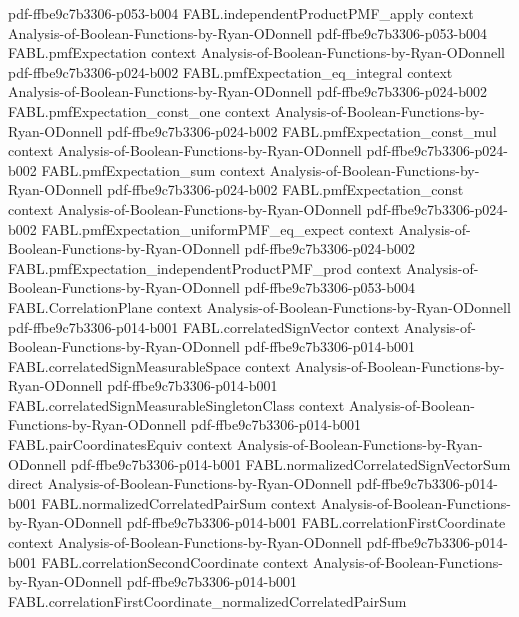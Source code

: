 \begin{theorem}
  {pdf-ffbe9c7b3306-p053-b004}
\proofstep
  {FABL.independentProductPMF_apply}
  {context}
  {Analysis-of-Boolean-Functions-by-Ryan-ODonnell}
  {pdf-ffbe9c7b3306-p053-b004}
\proofstep
  {FABL.pmfExpectation}
  {context}
  {Analysis-of-Boolean-Functions-by-Ryan-ODonnell}
  {pdf-ffbe9c7b3306-p024-b002}
\proofstep
  {FABL.pmfExpectation_eq_integral}
  {context}
  {Analysis-of-Boolean-Functions-by-Ryan-ODonnell}
  {pdf-ffbe9c7b3306-p024-b002}
\proofstep
  {FABL.pmfExpectation_const_one}
  {context}
  {Analysis-of-Boolean-Functions-by-Ryan-ODonnell}
  {pdf-ffbe9c7b3306-p024-b002}
\proofstep
  {FABL.pmfExpectation_const_mul}
  {context}
  {Analysis-of-Boolean-Functions-by-Ryan-ODonnell}
  {pdf-ffbe9c7b3306-p024-b002}
\proofstep
  {FABL.pmfExpectation_sum}
  {context}
  {Analysis-of-Boolean-Functions-by-Ryan-ODonnell}
  {pdf-ffbe9c7b3306-p024-b002}
\proofstep
  {FABL.pmfExpectation_const}
  {context}
  {Analysis-of-Boolean-Functions-by-Ryan-ODonnell}
  {pdf-ffbe9c7b3306-p024-b002}
\proofstep
  {FABL.pmfExpectation_uniformPMF_eq_expect}
  {context}
  {Analysis-of-Boolean-Functions-by-Ryan-ODonnell}
  {pdf-ffbe9c7b3306-p024-b002}
\proofstep
  {FABL.pmfExpectation_independentProductPMF_prod}
  {context}
  {Analysis-of-Boolean-Functions-by-Ryan-ODonnell}
  {pdf-ffbe9c7b3306-p053-b004}
\proofstep
  {FABL.CorrelationPlane}
  {context}
  {Analysis-of-Boolean-Functions-by-Ryan-ODonnell}
  {pdf-ffbe9c7b3306-p014-b001}
\proofstep
  {FABL.correlatedSignVector}
  {context}
  {Analysis-of-Boolean-Functions-by-Ryan-ODonnell}
  {pdf-ffbe9c7b3306-p014-b001}
\proofstep
  {FABL.correlatedSignMeasurableSpace}
  {context}
  {Analysis-of-Boolean-Functions-by-Ryan-ODonnell}
  {pdf-ffbe9c7b3306-p014-b001}
\proofstep
  {FABL.correlatedSignMeasurableSingletonClass}
  {context}
  {Analysis-of-Boolean-Functions-by-Ryan-ODonnell}
  {pdf-ffbe9c7b3306-p014-b001}
\proofstep
  {FABL.pairCoordinatesEquiv}
  {context}
  {Analysis-of-Boolean-Functions-by-Ryan-ODonnell}
  {pdf-ffbe9c7b3306-p014-b001}
\proofstep
  {FABL.normalizedCorrelatedSignVectorSum}
  {direct}
  {Analysis-of-Boolean-Functions-by-Ryan-ODonnell}
  {pdf-ffbe9c7b3306-p014-b001}
\proofstep
  {FABL.normalizedCorrelatedPairSum}
  {context}
  {Analysis-of-Boolean-Functions-by-Ryan-ODonnell}
  {pdf-ffbe9c7b3306-p014-b001}
\proofstep
  {FABL.correlationFirstCoordinate}
  {context}
  {Analysis-of-Boolean-Functions-by-Ryan-ODonnell}
  {pdf-ffbe9c7b3306-p014-b001}
\proofstep
  {FABL.correlationSecondCoordinate}
  {context}
  {Analysis-of-Boolean-Functions-by-Ryan-ODonnell}
  {pdf-ffbe9c7b3306-p014-b001}
\proofstep
  {FABL.correlationFirstCoordinate_normalizedCorrelatedPairSum}

\end{theorem}
